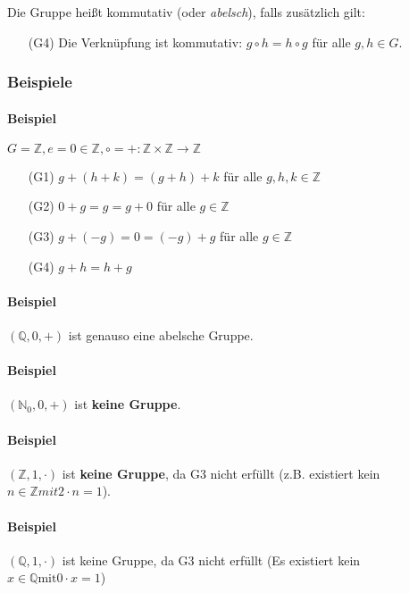 \documentclass[14pt,a4paper]{article}
\newcommand{\N}{\ensuremath{\mathbb{N}}}
\newcommand{\Z}{\ensuremath{\mathbb{Z}}}
\newcommand{\Nzero}{\ensuremath{\N_0}}
\begin{document}
    Die Gruppe heißt kommutativ (oder \textit{abelsch}), falls zusätzlich gilt:
    \begin{enumerate}
      \item[(G4)] Die Verknüpfung ist kommutativ: $g \circ h = h \circ g$ für alle
   	 $g,h \in G$.
    \end{enumerate}

    \subsubsection{Beispiele}
    \paragraph{Beispiel}
    $ G = \mathbb{Z}, e = 0 \in \mathbb{Z}, \circ=+ : \Z \times \Z \to \Z $

    \begin{enumerate}
      \item[(G1)] $g+(h+k) = (g+h)+k$ für alle $g,h,k \in \Z$\\ \par
      \item[(G2)] $0+g = g = g+0 $ für alle $g \in \Z$ \\ \par
      \item[(G3)] $g + (-g) = 0 = (-g) + g$ für alle $g \in \Z$ \\ \par
      \item[(G4)] $g+h = h+g$
    \end{enumerate}

    \paragraph{Beispiel} $(\mathbb{Q}, 0, +)$ ist genauso eine abelsche Gruppe.
    \paragraph{Beispiel} $(\Nzero, 0, +)$ ist \textbf{keine Gruppe}.
    \paragraph{Beispiel} $(\Z, 1, \cdot)$ ist \textbf{keine Gruppe}, da G3 nicht
    erfüllt (z.B. existiert kein $n \in \Z mit 2 \cdot n = 1$).
    \paragraph{Beispiel} $(\mathbb{Q}, 1, \cdot)$ ist keine Gruppe, da G3 nicht
    erfüllt (Es existiert kein $x \in \mathbb{Q} \text{mit} 0 \cdot x=1$)
\end{document}
